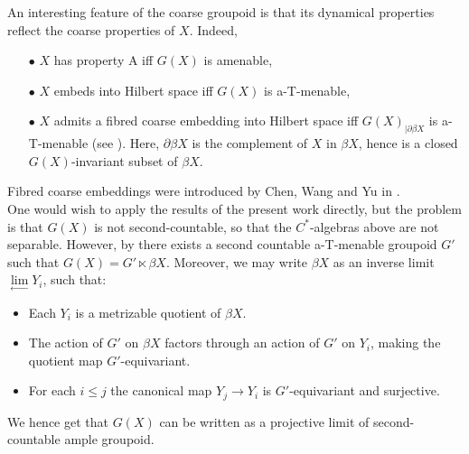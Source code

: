 An interesting feature of the coarse groupoid is that its dynamical properties reflect the coarse properties of $X$. Indeed,
\begin{itemize}
\item[$\bullet$] $X$ has property A iff $G(X)$ is amenable,
\item[$\bullet$] $X$ embeds into Hilbert space iff $G(X)$ is a-T-menable,
\item[$\bullet$] $X$ admits a fibred coarse embedding into Hilbert space iff $G(X)_{|\partial \beta X }$ is a-T-menable (see \cite{FinnSellFibred}). Here, $\partial \beta X$ is the complement of $X$ in $\beta X$, hence is a closed $G(X)$-invariant subset of $\beta X$.
\end{itemize}
Fibred coarse embeddings were introduced by Chen, Wang and Yu in \cite{ChenWangYu}.\\

One would wish to apply the results of the present work directly, but the problem is that $G(X)$ is not second-countable, so that the $C^*$-algebras above are not separable. However, by \cite[Theorem~5.4]{STY02} there exists a second countable a-T-menable groupoid $G'$ such that $G(X)=G'\ltimes \beta X$. Moreover, we may write $\beta X$ as an inverse limit $\lim\limits_{\longleftarrow} Y_i$, such that:
\begin{itemize}
\item Each $Y_i$ is a metrizable quotient of $\beta X$.
\item The action of $G'$ on $\beta X$ factors through an action of $G'$ on $Y_i$, making the quotient map $G'$-equivariant.
\item For each $i\leq j$ the canonical map $Y_j\rightarrow Y_i$ is $G'$-equivariant and surjective.
\end{itemize}
We hence get that $G(X)$ can be written as a projective limit of second-countable ample groupoid. 

